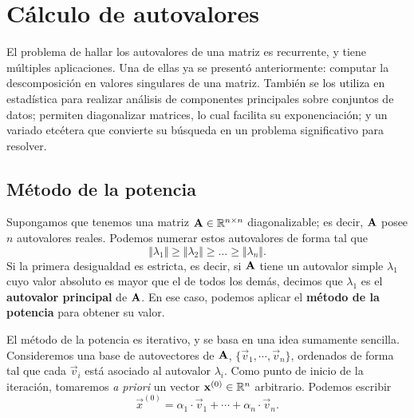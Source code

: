 
\section{Cálculo de autovalores}
\label{section:autovalores}

El problema de hallar los autovalores de una matriz es recurrente, y tiene
múltiples aplicaciones. Una de ellas ya se presentó anteriormente: computar
la descomposición en valores singulares de una matriz. También se los
utiliza en estadística para realizar análisis de componentes principales
sobre conjuntos de datos; permiten diagonalizar matrices, lo cual facilita
su exponenciación; y un variado etcétera que convierte su búsqueda
en un problema significativo para resolver.

\subsection{Método de la potencia}

Supongamos que tenemos una matriz $\mathbf{A} \in \mathbb{R}^{n \times n}$
diagonalizable; es decir, $\mathbf{A}$ posee $n$ autovalores reales. Podemos
numerar estos autovalores de forma tal que
\[ \Vert \lambda_1 \Vert \geq \Vert \lambda_2 \Vert \geq \dots
    \geq \Vert \lambda_n \Vert. \]
Si la primera desigualdad es estricta, es decir, si $\mathbf{A}$ tiene un
autovalor simple $\lambda_1$ cuyo valor absoluto es mayor que el de todos los
demás, decimos que $\lambda_1$ es el \textbf{autovalor principal} de
$\mathbf{A}$. En ese caso, podemos aplicar el \textbf{método de la potencia} para
obtener su valor.

El método de la potencia es iterativo, y se basa en una idea sumamente
sencilla. Consideremos una base de autovectores de $\mathbf{A}$, $\{\vec{v}_1,
\cdots, \vec{v}_n\}$, ordenados de forma tal que cada $\vec{v}_i$ está
asociado al autovalor $\lambda_i$. Como punto de inicio de la iteración,
tomaremos \emph{a priori} un vector $\mathbf{x}^{(0)} \in \mathbb{R}^n$ arbitrario.
Podemos escribir
\[ \vec{x}^{(0)} = \alpha_1 \cdot \vec{v}_1
    + \cdots + \alpha_n \cdot \vec{v}_n. \]

